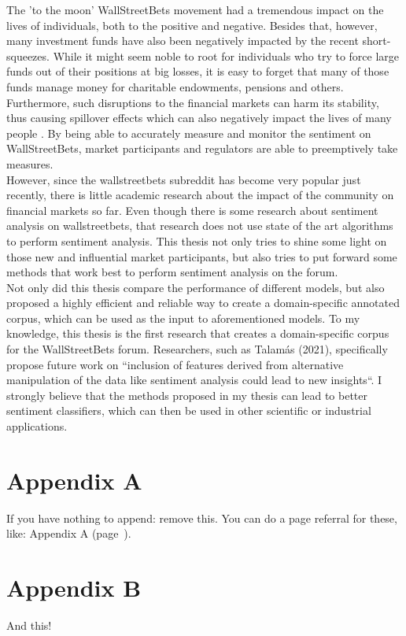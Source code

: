 \documentclass[11pt, a4paper]{article}
\begin{document}
The 'to the moon' WallStreetBets movement had a tremendous impact on the lives of individuals, both to the positive and negative. 
Besides that, however, many investment funds have also been negatively impacted by the recent short-squeezes. 
While it might seem noble to root for individuals who try to force large funds out of their positions at big losses, it is easy to forget that many 
of those funds manage money for charitable endowments, pensions and others. 
Furthermore, such disruptions to the financial markets can harm its stability, thus causing spillover effects which can also negatively impact the 
lives of many people \citep{lyocsa2021yolotrading}.
By being able to accurately measure and monitor the sentiment on WallStreetBets, market participants and regulators are able to preemptively take measures.\\
However, since the wallstreetbets subreddit has become very popular just recently, there is little academic research about the impact of the community on 
financial markets so far. Even though there is some research about sentiment analysis on wallstreetbets, that research does not use state of the art algorithms to perform 
sentiment analysis. This thesis not only tries to shine some light on those new and influential market participants, but also tries to put forward some methods that work 
best to perform sentiment analysis on the forum. \\
Not only did this thesis compare the performance of different models, but also proposed a highly efficient and reliable way to create a domain-specific annotated corpus, 
which can be used as the input to aforementioned models. To my knowledge, this thesis is the first research that creates a domain-specific corpus for the WallStreetBets forum. 
Researchers, such as Talamás (2021), specifically propose future work on “inclusion of features derived from alternative manipulation of the data like sentiment analysis 
could lead to new insights“. I strongly believe that the methods proposed in my thesis can lead to better sentiment classifiers, 
which can then be used in other scientific or industrial applications.



\section*{Appendix A} \label{app:a}

If you have nothing to append: remove this. You can do a page referral for these, like: Appendix A (page~\pageref{app:a}).

\section*{Appendix B}

And this!
\end{document}
